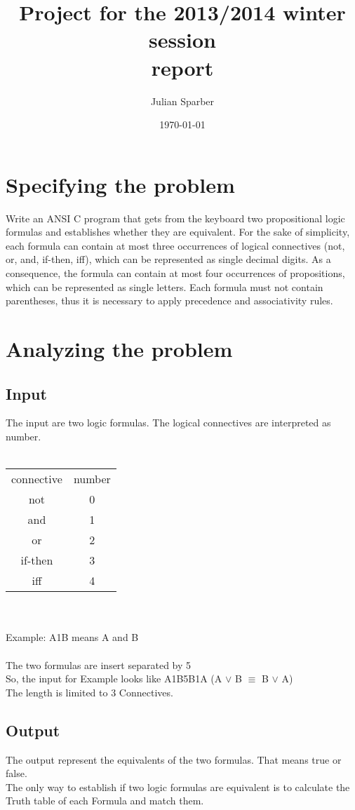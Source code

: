 \documentclass[11pt, a4paper, titlepage, block]{article}
\title{\textbf{Project for the 2013/2014 winter session\\ report}}
\author{Julian Sparber}
\date{\today}
\begin{document}
\maketitle
\section{Specifying the problem}
	Write an ANSI C program that gets from the keyboard two propositional logic formulas and
	establishes whether they are equivalent. For the sake of simplicity, each formula can contain at
	most three occurrences of logical connectives (not, or, and, if-then, iff), which can be represented
	as single decimal digits. As a consequence, the formula can contain at most four occurrences of
	propositions, which can be represented as single letters. Each formula must not contain parentheses,
	thus it is necessary to apply precedence and associativity rules.
	\newpage
\section{Analyzing the problem}
	\subsection{Input}
	The input are two logic formulas. The logical connectives are interpreted as number. \\
	\\
	\begin{tabular}{cc}
	connective & number\\
		not & 0\\
		and & 1\\
		or & 2\\
		if-then & 3\\
		iff & 4\\
	\end{tabular}\\
	\\
	Example: A1B means A and B\\
	\\ 
	The two formulas are insert separated by 5\\
	So, the input for Example looks like A1B5B1A (A $\vee $ B $\equiv $ B $\vee $ A)\\
	The length is limited to 3 Connectives.
	\subsection{Output}
	The output represent the equivalents of the two formulas. That means true or false.\\
	The only way to establish if two logic formulas are equivalent is to calculate the Truth table of each Formula and match them.
	
\end{document}
